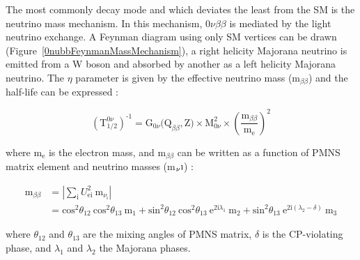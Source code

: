 \documentclass[main.tex]{subfiles}
\begin{document}
\NI The most commonly decay mode and which deviates the least from the SM is the neutrino mass mechanism. In this mechanism, 0$\nu\beta\beta$ is mediated by the light neutrino exchange. A Feynman diagram using only SM vertices can be drawn (Figure~\ref{0nubbFeynmanMassMechanism}), a right helicity Majorana neutrino is emitted from a W boson and absorbed by another as a left helicity Majorana neutrino. The $\eta$ parameter is given by the effective neutrino mass (m$_{\beta\beta}$) and the half-life can be expressed : 


\begin{equation}
(\text{T}_{\text{1/2}}^{\text{0}\nu})^{\text{-1}} = \text{G}_{\text{0}\nu}\text{(Q}_{\beta\beta},\text{Z)} \times \text{M}^\text{2}_{\text{0}\nu} \times \left( \frac{\text{m}_{\beta\beta}}{\text{m}_\text{e}} \right)^\text{2}
\end{equation}


\bigskip


\NI where m$_\text{e}$ is the electron mass, and m$_{\beta\beta}$ can be written as a function of PMNS matrix element and neutrino masses (m$_\nu\text{\i}$) : 


\begin{equation}
\begin{split}
\text{m}_{\beta\beta} & = |\sum_\text{i}U_{\text{ei}}^\text{2}~\text{m}_{\nu_\text{i}} | \\
 & = \text{cos}^\text{2}\theta_{\text{12}}~\text{cos}^\text{2}\theta_{\text{13}}~\text{m}_\text{1} + \text{sin}^\text{2}\theta_{\text{12}}~\text{cos}^\text{2}\theta_{\text{13}}~\text{e}^{\text{2i}\lambda_\text{1}} ~\text{m}_\text{2} + \text{sin}^\text{2}\theta_{\text{13}}~\text{e}^{\text{2i}(\lambda_\text{2}-\delta)}~\text{m}_\text{3}
\end{split}
\end{equation}


\bigskip


\NI where $\theta_{\text{12}}$ and $\theta_{\text{13}}$ are the mixing angles of PMNS matrix, $\delta$ is the CP-violating phase, and $\lambda_\text{1}$ and $\lambda_\text{2}$ the Majorana phases.  
\end{document}
